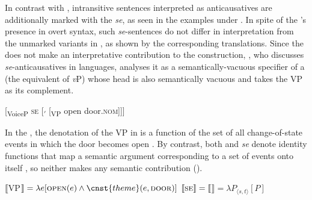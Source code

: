 \documentclass[output=paper,nonflat,newtxmath]{langsci/langscibook}
\begin{document}
\noindent In contrast with  ,  intransitive sentences interpreted as anticausatives are additionally marked with the  \textit{se}, as seen in the examples under . In spite of the ’s presence in overt syntax, such \textit{se}-sentences do not differ in interpretation from the unmarked variants in , as shown by the corresponding translations. Since the  does not make an interpretative contribution to the construction, \citet{schaffer2017}, who discusses \textit{se}-anticausatives in  languages, analyses it as a semantically-vacuous specifier of a  (the equivalent of  \textit{v}P) whose head is also semantically vacuous and takes the VP as its complement.

\begin{exe}
\ex \label{ex:lenardic: 6} {[\textsubscript{VoiceP} \textsc{se} [\textsubscript{$'$}  [\textsubscript{VP} open door.\textsc{nom}]]]}
\end{exe}

\noindent In the , the denotation of the VP in  is a function of the set of all change-of-state events in which the door becomes open . By contrast, both  and \textit{se} denote identity functions that map a semantic argument corresponding to a set of events onto itself , so neither makes any semantic contribution  (\citealt{schaffer2017}).

\begin{exe}
\ex \label{ex:lenardic: 7} $\llbracket$VP$\rrbracket = \lambda e[\textsc{open}(e) \wedge \cnst{theme}(e,\textsc{door})]$
\ex \label{ex:lenardic: 8} $\llbracket\textsc{se}\rrbracket = \llbracket$$\rrbracket = \lambda P_{\langle s,t\rangle}[P]$
\end{exe}
\end{document}
